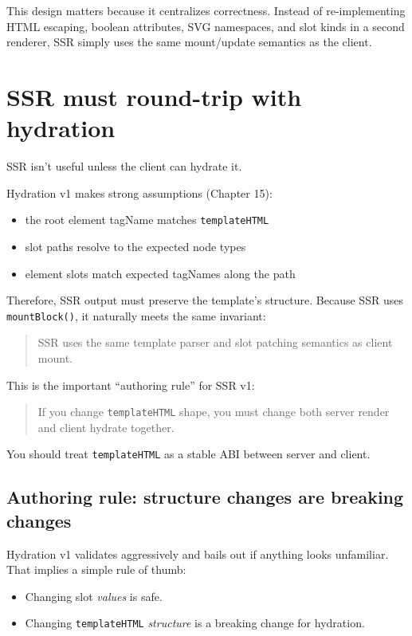 This design matters because it centralizes correctness.
Instead of re-implementing HTML escaping, boolean attributes, SVG namespaces, and slot kinds in a second renderer,
SSR simply uses the same mount/update semantics as the client.

\section{SSR must round-trip with hydration}

SSR isn't useful unless the client can hydrate it.

Hydration v1 makes strong assumptions (Chapter 15):

\begin{itemize}
  \item the root element tagName matches \texttt{templateHTML}
  \item slot paths resolve to the expected node types
  \item element slots match expected tagNames along the path
\end{itemize}

Therefore, SSR output must preserve the template’s structure.
Because SSR uses \texttt{mountBlock()}, it naturally meets the same invariant:

\begin{quote}
SSR uses the same template parser and slot patching semantics as client mount.
\end{quote}

This is the important “authoring rule” for SSR v1:

\begin{quote}
If you change \texttt{templateHTML} shape, you must change both server render and client hydrate together.
\end{quote}

You should treat \texttt{templateHTML} as a stable ABI between server and client.

\subsection{Authoring rule: structure changes are breaking changes}

Hydration v1 validates aggressively and bails out if anything looks unfamiliar.
That implies a simple rule of thumb:

\begin{itemize}
  \item Changing slot \emph{values} is safe.
  \item Changing \texttt{templateHTML} \emph{structure} is a breaking change for hydration.
\end{itemize}

